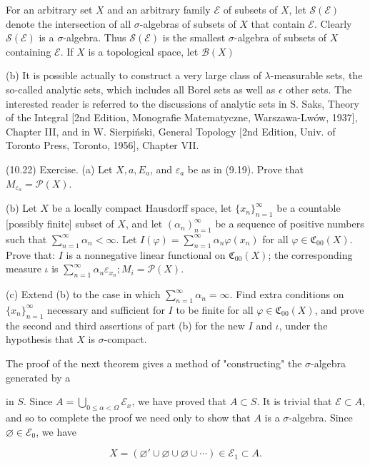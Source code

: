 For an arbitrary set $X$ and an arbitrary family $\mathcal{E}$ of subsets of $X$, let $\mathcal{S}(\mathcal{E})$ denote the intersection of all $\sigma$-algebras of subsets of $X$ that contain $\mathcal{E}$. Clearly $\mathcal{S}(\mathcal{E})$ is a $\sigma$-algebra. Thus $\mathcal{S}(\mathcal{E})$ is the smallest $\sigma$-algebra of subsets of $X$ containing $\mathcal{E}$. If $X$ is a topological space, let $\mathcal{B}(X)$

(b) It is possible actually to construct a very large class of $\lambda$-measurable sets, the so-called analytic sets, which includes all Borel sets as well as $\epsilon$ other sets. The interested reader is referred to the discussions of analytic sets in S. Saks, Theory of the Integral [2nd Edition, Monografie Matematyczne, Warszawa-Lwów, 1937], Chapter III, and in W. Sierpiński, General Topology [2nd Edition, Univ. of Toronto Press, Toronto, 1956], Chapter VII.

(10.22) Exercise. (a) Let $X, a, E_a$, and $\varepsilon_a$ be as in (9.19). Prove that $M_{\varepsilon_a} = \mathcal{P}(X)$.

(b) Let $X$ be a locally compact Hausdorff space, let $\{x_n\}_{n=1}^{\infty}$ be a countable [possibly finite] subset of $X$, and let $(\alpha_n)_{n=1}^{\infty}$ be a sequence of positive numbers such that $\sum_{n=1}^{\infty} \alpha_n < \infty$. Let $I(\varphi) = \sum_{n=1}^{\infty} \alpha_n \varphi(x_n)$ for all $\varphi \in \mathfrak{C}_{00}(X)$. Prove that: $I$ is a nonnegative linear functional on $\mathfrak{C}_{00}(X)$; the corresponding measure $\iota$ is $\sum_{n=1}^{\infty} \alpha_n \varepsilon_x_n; M_i = \mathcal{P}(X)$.

(c) Extend (b) to the case in which $\sum_{n=1}^{\infty} \alpha_n = \infty$. Find extra conditions on $\{x_n\}_{n=1}^{\infty}$ necessary and sufficient for $I$ to be finite for all $\varphi \in \mathfrak{C}_{00}(X)$, and prove the second and third assertions of part (b) for the new $I$ and $\iota$, under the hypothesis that $X$ is $\sigma$-compact.

The proof of the next theorem gives a method of "constructing" the $\sigma$-algebra generated by a

in $S$. Since $A = \bigcup_{0 \leq \alpha < \Omega} \mathcal{E}_x$, we have proved that $A \subset S$. It is trivial that $\mathcal{E} \subset A$, and so to complete the proof we need only to show that $A$ is a $\sigma$-algebra. Since $\varnothing \in \mathcal{E}_0$, we have

$$X = (\varnothing' \cup \varnothing \cup \varnothing \cup \cdots) \in \mathcal{E}_1 \subset A.$$

